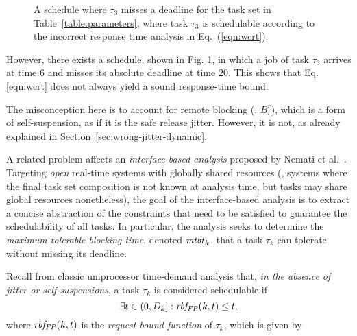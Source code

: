 \begin{figure}[t]
{}       
\caption{A schedule where $\tau_3$ misses a deadline for the task set in Table~\ref{table:parameters}, where  task $\tau_3$ is schedulable according to the incorrect
 response time analysis in Eq.~(\ref{eqn:wcrt}).}
\label{fig:counterexample_protocol}
\end{figure}

\ifpaper
 \fi

However, there exists a schedule, shown in Fig. \ref{fig:counterexample_protocol}, in which a job of task $\tau_3$ arrives at time $6$ and misses its absolute deadline at time $20$. This shows that Eq. \eqref{eqn:wcrt} does not always yield a sound response-time bound. 

The misconception here is to account for remote blocking (\ie, $B_i^r$), which is a form of self-suspension, as if it is the safe release jitter. However, it is not, as already explained in Section~\ref{sec:wrong-jitter-dynamic}.


A related problem affects an \emph{interface-based analysis}  proposed by Nemati et al.~\cite{NBN:11}. Targeting \emph{open} real-time systems with globally shared resources (\ie, systems where the final task set composition is not known at analysis time, but tasks may share global resources nonetheless), the goal of the interface-based analysis is to extract a concise abstraction of the constraints that need to be satisfied  to guarantee the schedulability of all tasks. In particular, the analysis seeks to determine the \emph{maximum tolerable blocking time}, denoted $\mathit{mtbt}_k$, that a task $\tau_k$ can tolerate without missing its deadline. 

Recall from classic uniprocessor time-demand analysis \cite{lehoczky-1989} that, \emph{in the absence of jitter or self-suspensions}, a task $\tau_k$ is considered schedulable if
\begin{equation}
\label{eqn:rbf-1}
\exists t \in (0,D_k]: \mathit{rbf_{FP}}(k,t) \leq t, 
\end{equation}
where $\mathit{rbf_{FP}}(k,t)$ is the \emph{request bound function} of $\tau_k$, which is given by


